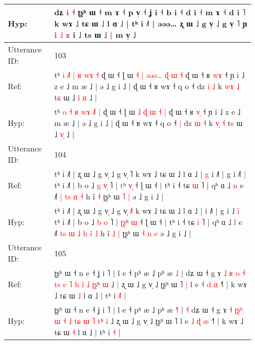 \documentclass[10pt]{article}
\DeclareRobustCommand{\hl}[1]{{\textcolor{red}{#1}}}
\begin{document}
\begin{longtable}{ll}
 \\
Hyp: & dʑ \hl{i} ˧ ʈʂʰ ɯ ˧\hl{}\hl{} m ɤ ˧ p v̩ ˧\hl{}\hl{} ʝ i ˧ b i ˧ d i ˧ m ɤ ˧ d i \hl{}˥\hl{}\hl{} k wɤ ˩ tɕ ɯ ˩ l ɑ ˩ | tʰ i ˩˥ | əəə… ʐ ɯ ˩ g v̩ ˩ g v̩ ˥ ɲ\hl{ }\hl{i}\hl{ }\hl{˩}\hl{ }\hl{z} i ˩ ts ɯ ˩\hl{ }\hl{|} m v̩ ˩\hl{}\hl{}
 \\
\midrule
Utterance ID: & 103 \\
Ref: & tʰ \hl{i} \hl{˩}\hl{˥} \hl{|} \hl{}\hl{ʁ} \hl{w}\hl{ɤ} \hl{˧} ɖ ɯ ˧ ɭ ɯ\hl{ }\hl{˧} \hl{|} \hl{ə}\hl{ə}\hl{ə}\hl{…} \hl{ɖ} \hl{ɯ} \hl{˧} ɖ ɯ ˧ ʁ \hl{w}\hl{ɤ} ˧ ɲ i ˩ z e ˩ m æ ˩ | ə ˩ g i ˩ | ɖ ɯ ˧ ʁ wɤ ˧ q o ˧\hl{}\hl{} dz \hl{i} \hl{˩} k \hl{w}\hl{ɤ} \hl{˩} t\hl{ɕ} ɯ ˩ \hl{l}\hl{ }\hl{ɑ} ˩ |
 \\
Hyp: & tʰ \hl{o} \hl{}\hl{˧} \hl{ʁ} \hl{w}\hl{ɤ} \hl{˩}\hl{˥} \hl{|} ɖ ɯ ˧ ɭ ɯ\hl{}\hl{} \hl{˩} \hl{}\hl{}\hl{}\hl{ɖ} \hl{ɯ} \hl{˧} \hl{|} ɖ ɯ ˧ ʁ \hl{v}\hl{̩} ˧ ɲ i ˩ z e ˩ m æ ˩ | ə ˩ g i ˩ | ɖ ɯ ˧ ʁ wɤ ˧ q o ˧\hl{ }\hl{|} dz \hl{ɯ} \hl{˧} k \hl{v}\hl{̩} \hl{˧} t\hl{s} ɯ ˩ \hl{}\hl{v}\hl{̩} ˩ |
 \\
\midrule
Utterance ID: & 104 \\
Ref: & tʰ i ˩˥ | ʐ ɯ ˩ g v̩ ˩ g v̩ \hl{}˥ k wɤ ˩ tɕ ɯ ˩ l ɑ ˩ |\hl{ }\hl{g} i ˩˥ | g i ˩\hl{˥}\hl{ }\hl{|} tʰ i ˩˥ | b o ˩ \hl{g} \hl{v}\hl{̩} ˥ | \hl{}\hl{t}ʰ \hl{v}\hl{̩} ˧ ɭ ɯ ˧ | tʰ i ˧ tɕ \hl{ɯ} ˥ | qʰ ɑ ˩ \hl{n} e ˩˥\hl{}\hl{}\hl{} \hl{|} \hl{}\hl{t}\hl{s} \hl{}\hl{ɑ} \hl{˧} h ĩ\hl{}\hl{} \hl{˧} ʈʂʰ ɯ\hl{}\hl{} \hl{˥} \hl{|} ə ˩ g i ˩ |
 \\
Hyp: & tʰ i ˩˥ | ʐ ɯ ˩ g v̩ ˩ g v̩ \hl{˩}˥ k wɤ ˩ tɕ ɯ ˩ l ɑ ˩ |\hl{}\hl{} i ˩˥ | g i ˩\hl{ }\hl{i}\hl{̃} tʰ i ˩˥ | b o ˩ \hl{b} \hl{}\hl{o} ˥ | \hl{ʈ}\hl{ʂ}ʰ \hl{}\hl{ɯ} ˧ ɭ ɯ ˧ | tʰ i ˧ tɕ \hl{i} ˥ | qʰ ɑ ˩ \hl{l} e ˩˥\hl{ }\hl{t}\hl{s} \hl{ɯ} \hl{˩}\hl{ }\hl{h} \hl{i}\hl{̃} \hl{˩} h ĩ\hl{ }\hl{˩} \hl{|} ʈʂʰ ɯ\hl{ }\hl{˧} \hl{n} \hl{e} ə ˩ g i ˩ |
 \\
\midrule
Utterance ID: & 105 \\
Ref: & ʈʂʰ ɯ ˧ n e ˧ ʝ i ˥ | l e ˧ pʰ æ ˩ pʰ æ \hl{}\hl{˩} |\hl{}\hl{} dʑ ɯ ˧ g ɤ \hl{˩} \hl{ʁ}\hl{ }\hl{o} \hl{˧} \hl{t}\hl{s} \hl{e} \hl{˥}\hl{ }\hl{h} \hl{i}\hl{̃} \hl{˩} \hl{ʈ}\hl{ʂ}ʰ \hl{ɯ} ˩\hl{ }\hl{|} ʐ ɯ ˩ g v̩ ˩ ʈʂʰ ɯ ˥\hl{ }\hl{|} l e \hl{˧} \hl{d} \hl{ɑ} ˧˥ | k wɤ ˩ tɕ ɯ \hl{˩} l ɑ ˩ | tʰ i \hl{˩}\hl{˥} |
 \\
Hyp: & ʈʂʰ ɯ ˧ n e ˧ ʝ i ˥ | l e ˧ pʰ æ ˩ pʰ æ \hl{˧}\hl{˥} |\hl{ }\hl{˧} dʑ ɯ ˧ g ɤ \hl{˧} \hl{ʈ}\hl{ʂ}\hl{ʰ} \hl{ɯ} \hl{}\hl{˧} \hl{˩} \hl{}\hl{t}\hl{ɕ} \hl{}\hl{ɯ} \hl{˥} \hl{}\hl{t}ʰ \hl{i} ˩\hl{}\hl{} ʐ ɯ ˩ g v̩ ˩ ʈʂʰ ɯ ˥\hl{}\hl{} l e \hl{˩} \hl{ɖ} \hl{æ} ˧˥ | k wɤ ˩ tɕ ɯ \hl{˧} l ɑ ˩ | tʰ i \hl{}\hl{˧} |

\end{longtable}
\end{document}
